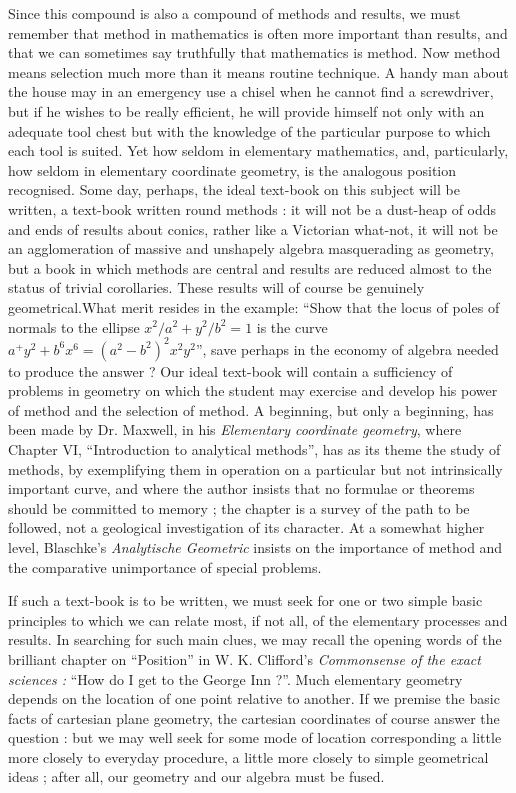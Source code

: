 Since this compound is also a compound of methods and results, we must
remember that method in mathematics is often more important than
results, and that we can sometimes say truthfully that mathematics is
method. Now method means selection much more than it means routine
technique. A handy man about the house may in an emergency use a
chisel when he cannot find a screwdriver, but if he wishes to be
really efficient, he will provide himself not only with an adequate
tool chest but with the knowledge of the particular purpose to which
each tool is suited. Yet how seldom in elementary mathematics,  and,
particularly, how seldom in elementary coordinate geometry, is the
analogous position recognised. Some day, perhaps, the ideal text-book
on this subject will be written, a text-book written round methods :
it will not be a dust-heap of odds and ends of results about conics,
rather like a Victorian what-not, it will not be an agglomeration of
massive and unshapely algebra masquerading as geometry, but a book in
which methods are central and results are reduced almost to the status
of trivial corollaries. These results will of course be genuinely
geometrical.\pageoriginale What merit resides in the example: ``Show that the locus
of poles of normals to the ellipse $x^2/a^2 + y^2/b^2 =1$ is the curve
$a^+ y^2 + b^6 x^6 = (a^2 - b^2)^2 x^2 y^2$'', save perhaps in the
economy of algebra needed to produce the answer ? Our ideal text-book
will contain a sufficiency of problems in geometry on which the
student may exercise and develop his power of method and the selection
of method. A beginning, but only a beginning, has been made by
Dr. Maxwell, in his \textit{Elementary coordinate geometry}, where
Chapter VI, ``Introduction to analytical methods'', has as its theme
the study of methods, by exemplifying them in operation on a
particular but not intrinsically important curve, and where the author
insists that no formulae or theorems should be committed to memory ;
the chapter is a survey of the path to be followed, not a geological
investigation of its character. At a somewhat higher level, Blaschke's
\textit{Analytische Geometric} insists on the importance of method and
the comparative unimportance of special problems.

If such a text-book is to be written, we must seek for one or two
simple basic principles to which we can relate most, if not all, of
the elementary processes and results. In searching for such main
clues, we may recall the opening words of the brilliant chapter on
``Position'' in W. K. Clifford's \textit{Commonsense of the exact
  sciences :}  ``How do I get to the George Inn ?''. Much elementary
geometry depends on the location of one point relative to another. If
we premise the basic facts of cartesian plane geometry, the cartesian
coordinates of course answer the question : but we may well seek for
some mode of location corresponding a little more closely to everyday
procedure, a little more closely to simple geometrical ideas ; after
all, our geometry and our algebra must be fused.

